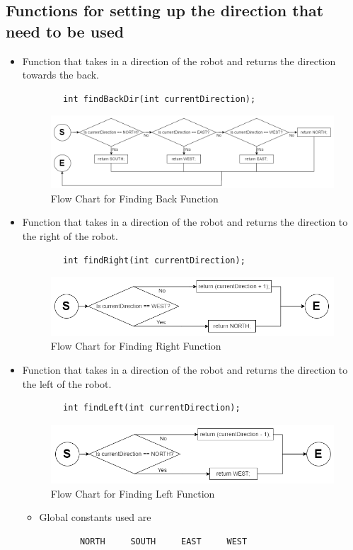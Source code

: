 \documentclass[11pt]{article}
\begin{document}

\subsection{Functions for setting up the direction that need to be used}
\begin{itemize}
\item Function that takes in a direction of the robot and returns the direction towards the back.
	\begin{verbatim}
		int findBackDir(int currentDirection);
	\end{verbatim}
\begin{figure}[htp]
\centering
\includegraphics[scale=0.45]{images/Software_Flowchart/findBackDir.png}
\caption{Flow Chart for Finding Back Function}
\label{}
\end{figure}
\item Function that takes in a direction of the robot and returns the direction to the right of the robot.
	\begin{verbatim}
		int findRight(int currentDirection);
	\end{verbatim}
\begin{figure}[htp]
\centering
\includegraphics[scale=0.47]{images/Software_Flowchart/findRight.png}
\caption{Flow Chart for Finding Right Function}
\label{}
\end{figure}	
\item Function that takes in a direction of the robot and returns the direction to the left of the robot.
	\begin{verbatim}
		int findLeft(int currentDirection);
	\end{verbatim}
\begin{figure}[htp]
\centering
\includegraphics[scale=0.48]{images/Software_Flowchart/findLeft.png}
\caption{Flow Chart for Finding Left Function}
\label{}
\end{figure}
	\begin{itemize}
	\item Global constants used are
	\begin{verbatim}
		NORTH     SOUTH     EAST     WEST
	\end{verbatim}
	\end{itemize}
\end{itemize}
\end{document}
